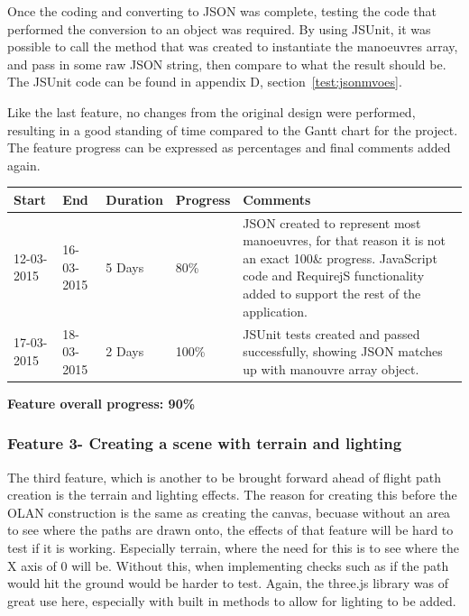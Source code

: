 Once the coding and converting to JSON was complete, testing the code that performed the conversion to an object was required. By using JSUnit, it was possible to call the method that was created to instantiate the manoeuvres array, and pass in some raw JSON string, then compare to what the result should be. The JSUnit code can be found in appendix D, section~\ref{test:jsonmvoes}.

Like the last feature, no changes from the original design were performed, resulting in a good standing of time compared to the Gantt chart for the project. The feature progress can be expressed as percentages and final comments added again.

\begin{table}[h]
\begin{tabular}{|l|l|l|l|p{7cm}|}
\hline
\textbf{Start} & \textbf{End} & \textbf{Duration} & \textbf{Progress} & \textbf{Comments}                                                                                                     \\ \hline
12-03-2015     & 16-03-2015   & 5 Days            & 80\%             & JSON created to represent most manoeuvres, for that reason it is not an exact 100\& progress. JavaScript code and RequirejS functionality added to support the rest of the application. \\ \hline
17-03-2015     & 18-03-2015   & 2 Days            & 100\%             & JSUnit tests created and passed successfully, showing JSON matches up with manouvre array object.\\ \hline
\end{tabular}
\end{table}

\textbf{Feature overall progress: 90\%}

\subsubsection{Feature 3- Creating a scene with terrain and lighting}
The third feature, which is another to be brought forward ahead of flight path creation is the terrain and lighting effects. The reason for creating this before the OLAN construction is the same as creating the canvas, becuase without an area to see where the paths are drawn onto, the effects of that feature will be hard to test if it is working. Especially terrain, where the need for this is to see where the X axis of 0 will be. Without this, when implementing checks such as if the path would hit the ground would be harder to test. Again, the three.js library was of great use here, especially with built in methods to allow for lighting to be added.

